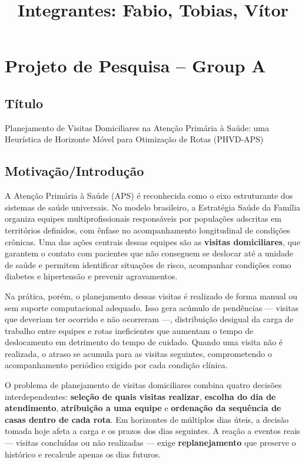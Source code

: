 \documentclass[11pt,a4paper]{article}
\author{}
\date{}
\begin{document}
\small
\sloppy

\section{Projeto de Pesquisa -- Group A}\label{projeto-de-pesquisa}

\title{Integrantes: Fabio, Tobias, Vítor}


\subsection{Título}\label{tuxedtulo}

Planejamento de Visitas Domiciliares na Atenção Primária à Saúde: uma
Heurística de Horizonte Móvel para Otimização de Rotas (PHVD-APS)

\subsection{Motivação/Introdução}\label{motivauxe7uxe3ointroduuxe7uxe3o}

A Atenção Primária à Saúde (APS) é reconhecida como o eixo estruturante
dos sistemas de saúde universais. No modelo brasileiro, a Estratégia
Saúde da Família organiza equipes multiprofissionais responsáveis por
populações adscritas em territórios definidos, com ênfase no
acompanhamento longitudinal de condições crônicas. Uma das ações
centrais dessas equipes são as \textbf{visitas domiciliares}, que
garantem o contato com pacientes que não conseguem se deslocar até a
unidade de saúde e permitem identificar situações de risco, acompanhar
condições como diabetes e hipertensão e prevenir agravamentos.

Na prática, porém, o planejamento dessas visitas é realizado de forma
manual ou sem suporte computacional adequado. Isso gera acúmulo de
pendências --- visitas que deveriam ter ocorrido e não ocorreram ---,
distribuição desigual da carga de trabalho entre equipes e rotas
ineficientes que aumentam o tempo de deslocamento em detrimento do tempo
de cuidado. Quando uma visita não é realizada, o atraso se acumula para
as visitas seguintes, comprometendo o acompanhamento periódico exigido
por cada condição clínica.

O problema de planejamento de visitas domiciliares combina quatro
decisões interdependentes: \textbf{seleção de quais visitas realizar},
\textbf{escolha do dia de atendimento}, \textbf{atribuição a uma equipe}
e \textbf{ordenação da sequência de casas dentro de cada rota}. Em
horizontes de múltiplos dias úteis, a decisão tomada hoje afeta a carga
e os prazos dos dias seguintes. A reação a eventos reais --- visitas
concluídas ou não realizadas --- exige \textbf{replanejamento} que
preserve o histórico e recalcule apenas os dias futuros.
\end{document}
